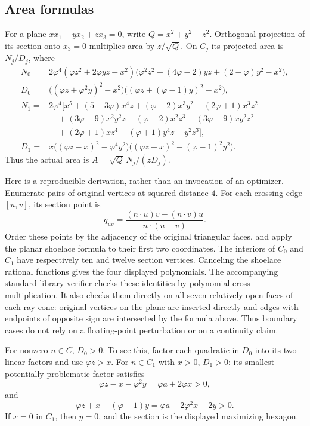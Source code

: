 \subsection{Area formulas}
For a plane $xx_1+yx_2+zx_3=0$, write
$Q=x^2+y^2+z^2$. Orthogonal projection of its section onto $x_3=0$
multiplies area by $z/\sqrt Q$. On $C_j$ its projected area is $N_j/D_j$,
where
\begin{align*}
N_0={}&2\varphi^4(\varphi z^2+2\varphi yz-x^2)
 \bigl(\varphi^2z^2+(4\varphi-2)yz+(2-\varphi)y^2-x^2\bigr),\\
D_0={}&\bigl((\varphi z+\varphi^2y)^2-x^2\bigr)
        \bigl((\varphi z+(\varphi-1)y)^2-x^2\bigr),\\
N_1={}&2\varphi^4\bigl[x^5+(5-3\varphi)x^4z
 +(\varphi-2)x^3y^2-(2\varphi+1)x^3z^2\\
&\quad +(3\varphi-9)x^2y^2z+(\varphi-2)x^2z^3
 -(3\varphi+9)xy^2z^2\\
&\quad +(2\varphi+1)xz^4+(\varphi+1)y^4z-y^2z^3\bigr],\\
D_1={}&x\bigl((\varphi z-x)^2-\varphi^4y^2\bigr)
        \bigl((\varphi z+x)^2-(\varphi-1)^2y^2\bigr).
\end{align*}
Thus the actual area is $A=\sqrt Q\,N_j/(zD_j)$.

Here is a reproducible derivation, rather than an invocation of an
optimizer. Enumerate pairs of original vertices at squared distance $4$.
For each crossing edge $[u,v]$, its section point is
\[
 q_{uv}=\frac{(n\cdot u)v-(n\cdot v)u}{n\cdot(u-v)}.
\]
Order these points by the adjacency of the original triangular faces,
and apply the planar shoelace formula to their first two coordinates.
The interiors of $C_0$ and $C_1$ have respectively ten and twelve
section vertices. Canceling the shoelace rational functions gives the
four displayed polynomials. The accompanying standard-library verifier
checks these identities by polynomial cross multiplication. It also
checks them directly on all seven relatively open faces of each ray
cone: original vertices on the plane are inserted directly and edges
with endpoints of opposite sign are intersected by the formula above.
Thus boundary cases do not rely on a floating-point perturbation or on
a continuity claim.

For nonzero $n\in C$, $D_0>0$. To see this, factor each quadratic in
$D_0$ into its two linear factors and use $\varphi z>x$.
For $n\in C_1$ with $x>0$, $D_1>0$: its smallest potentially problematic
factor satisfies
\[
 \varphi z-x-\varphi^2y=\varphi a+2\varphi x>0,
\]
and
\[
 \varphi z+x-(\varphi-1)y
 =\varphi a+2\varphi^2x+2y>0.
\]
If $x=0$ in $C_1$, then $y=0$, and the section is the displayed maximizing
hexagon.


